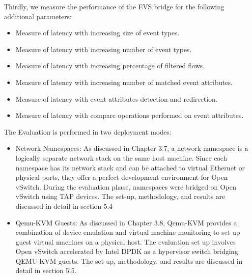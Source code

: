 Thirdly, we measure the performance of the EVS bridge for the following additional parameters:
\begin{itemize}
 \item Measure of latency with increasing size of event types.
 \item Measure of latency with increasing number of event types.
 \item Measure of latency with increasing percentage of filtered flows.
 \item Measure of latency with increasing number of matched event attributes. 
 \item Measure of latency with event attributes detection and redirection.
 \item Measure of latency with compare operations performed on event attributes.
\end{itemize}

The Evaluation is performed in two deployment modes:
\begin{itemize}
 \item Network Namespaces: As discussed in Chapter 3.7, a network namespace is a logically separate network stack on the same host machine. Since each namespace has its network stack and can be attached to virtual Ethernet or physical ports, they offer a perfect development environment for Open vSwitch. During the evaluation phase, namespaces were bridged on Open vSwitch using TAP devices. The set-up, methodology, and results are discussed in detail in section 5.4
 \item Qemu-KVM Guests: As discussed in Chapter 3.8, Qemu-KVM provides a combination of device emulation and virtual machine monitoring to set up guest virtual machines on a physical host. The evaluation set up involves Open vSwitch accelerated by Intel DPDK as a hypervisor switch bridging QEMU-KVM guests. The set-up, methodology, and results are discussed in detail in section 5.5.
\end{itemize}


